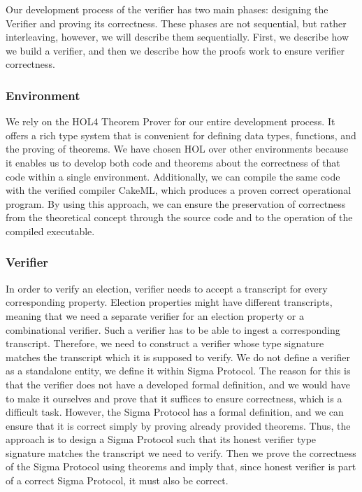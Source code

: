     Our development process of the verifier has two main phases: designing the Verifier and proving its correctness. These phases are not sequential, but rather interleaving, however, we will describe them sequentially. First, we describe how we build a verifier, and then we describe how the proofs work to ensure verifier correctness.

    \subsubsection{Environment}
    We rely on the HOL4 Theorem Prover for our entire development process. It offers a rich type system that is convenient for defining data types, functions, and the proving of theorems.
    We have chosen HOL over other environments because it enables us to develop both code and theorems about the correctness of that code within a single environment. Additionally, we can compile the same code with the verified compiler CakeML, which produces a proven correct operational program.
    By using this approach, we can ensure the preservation of correctness from the theoretical concept through the source code and to the operation of the compiled executable.



    \subsubsection{Verifier}
    In order to verify an election, verifier needs to accept a transcript for every corresponding property. Election properties might have different transcripts, meaning that we need a separate verifier for an election property or a combinational verifier. Such a verifier has to be able to ingest a corresponding transcript. Therefore, we need to construct a verifier whose type signature matches the transcript which it is supposed to verify. We do not define a verifier as a standalone entity, we define it within Sigma Protocol. The reason for this is that the verifier does not have a developed formal definition, and we would have to make it ourselves and prove that it suffices to ensure correctness, which is a difficult task. However, the Sigma Protocol has a formal definition, and we can ensure that it is correct simply by proving already provided theorems. Thus, the approach is to design a Sigma Protocol such that its honest verifier type signature matches the transcript we need to verify. Then we prove the correctness of the Sigma Protocol using theorems and imply that, since honest verifier is part of a correct Sigma Protocol, it must also be correct.


